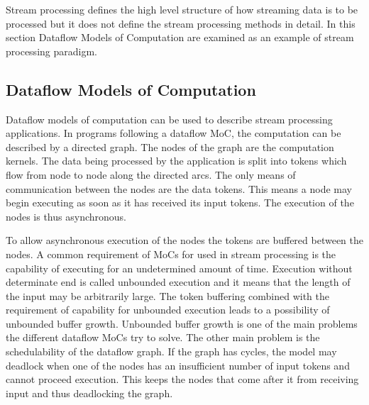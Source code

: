 Stream processing defines the high level structure of how streaming data is to be processed but it does not define the stream processing methods in detail. In this section Dataflow Models of Computation are examined as an example of stream processing paradigm.

\subsection{Dataflow Models of Computation}
\label{subsec:dataflow-moc}
Dataflow models of computation can be used to describe stream processing applications. In programs following a dataflow MoC, the computation can be described by a directed graph. The nodes of the graph are the computation kernels. The data being processed by the application is split into tokens which flow from node to node along the directed arcs. The only means of communication between the nodes are the data tokens. This means a node may begin executing as soon as it has received its input tokens. The execution of the nodes is thus asynchronous.~\cite{lee2015introduction}

To allow asynchronous execution of the nodes the tokens are buffered between the nodes. A common requirement of MoCs for used in stream processing is the capability of executing for an undetermined amount of time. Execution without determinate end is called unbounded execution and it means that the length of the input may be arbitrarily large. The token buffering combined with the requirement of capability for unbounded execution leads to a possibility of unbounded buffer growth. Unbounded buffer growth is one of the main problems the different dataflow MoCs try to solve. The other main problem is the schedulability of the dataflow graph. If the graph has cycles, the model may deadlock when one of the nodes has an insufficient number of input tokens and cannot proceed execution. This keeps the nodes that come after it from receiving input and thus deadlocking the graph.~\cite{lee2015introduction}

